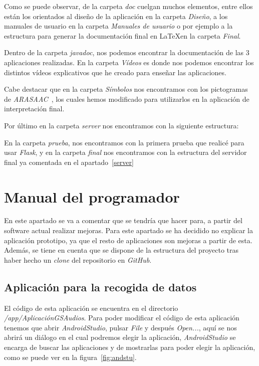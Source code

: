 Como se puede observar, de la carpeta \textit{doc} cuelgan muchos elementos, entre ellos están los orientados al diseño de la aplicación en la carpeta \textit{Diseño}, a los manuales de usuario en la carpeta \textit{Manuales de usuario} o por ejemplo a la estructura para generar la documentación final en \LaTeX en la carpeta \textit{Final}.

Dentro de la carpeta \textit{javadoc}, nos podemos encontrar la documentación de las 3 aplicaciones realizadas. En la carpeta \textit{Vídeos} es donde nos podemos encontrar los distintos vídeos explicativos que he creado para enseñar las aplicaciones.

Cabe destacar que en la carpeta \textit{Símbolos} nos encontramos con los pictogramas de \textit{ARASAAC}~\cite{arasaac}, los cuales hemos modificado para utilizarlos en la aplicación de interpretación final.

Por último en la carpeta \textit{server} nos encontramos con la siguiente estructura:

En la carpeta \textit{prueba}, nos encontramos con la primera prueba que realicé para usar \textit{Flask}, y en la carpeta \textit{final} nos encontramos con la estructura del servidor final ya comentada en el apartado~\ref{server}
\section{Manual del programador}
En este apartado se va a comentar que se tendría que hacer para, a partir del software actual realizar mejoras. Para este apartado se ha decidido no explicar la aplicación prototipo, ya que el resto de aplicaciones son mejoras a partir de esta. Además, se tiene en cuenta que se dispone de la estructura del proyecto tras haber hecho un \textit{clone} del repositorio en \textit{GitHub}.
\subsection{Aplicación para la recogida de datos}
El código de esta aplicación se encuentra en el directorio \textit{/app/AplicaciónGSAudios}. Para poder modificar el código de esta aplicación tenemos que abrir \textit{AndroidStudio}, pulsar \textit{File} y después \textit{Open...}, aquí se nos abrirá un diálogo en el cual podremos elegir la aplicación, \textit{AndroidStudio} se encarga de buscar las aplicaciones y de mostrarlas para poder elegir la aplicación, como se puede ver en la figura~\ref{fig:andstu}.

